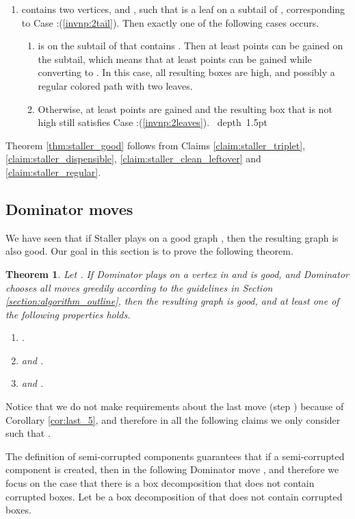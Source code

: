 \documentclass[11pt]{article}
\def\blackslug{\hbox{\hskip 1pt \vrule width 4pt height 8pt
    depth 1.5pt \hskip 1pt}}
\def\QED{\quad\blackslug\lower 8.5pt\null\par}
\def\dnsitem{\vspace{-7pt}\item}
\newtheorem{theorem}{Theorem}[section]
\theoremstyle{definition}
\begin{document}
\begin{enumerate}
		\dnsitem  contains two  vertices,  and , such that  is a leaf on a subtail of , corresponding to Case :(\ref{invnp:2tail}).
		Then exactly one of the following cases occurs.
		\begin{enumerate}
			\dnsitem  is on the subtail of  that contains . Then at least  points can be gained on the subtail, 
			which means that at least  points can be gained while converting  to .
			In this case, all resulting boxes are high, and possibly a regular colored path with two  leaves.
			\dnsitem Otherwise, at least  points are gained and the resulting box that is not high still satisfies Case :(\ref{invnp:2leaves}).
\QED
		\end{enumerate}
	\end{enumerate}

Theorem \ref{thm:staller_good} follows from Claims \ref{claim:staller_triplet}, \ref{claim:staller_dispensible}, \ref{claim:staller_clean_leftover} and \ref{claim:staller_regular}.

\subsection{Dominator moves}
\label{sub:an_dom}

We have seen that if Staller plays on a good graph , 
then the resulting graph is also good.
Our goal in this section is to prove the following theorem.

\begin{theorem}
\label{thm:dom_gain}
Let .
If Dominator plays on a vertex  in  and  is good, and Dominator chooses all moves greedily according to the guidelines in Section \ref{section:algorithm_outline},
then the resulting graph  is good, and at least one of the following properties holds.
\begin{enumerate}
	\dnsitem .
	\dnsitem  and .
	\dnsitem  and .
\end{enumerate}
\end{theorem}

Notice that we do not make requirements about the last move (step ) because of Corollary \ref{cor:last_5}, and therefore in all the following claims we only consider  such that .

The definition of semi-corrupted components guarantees that if a semi-corrupted component is created, then in the following Dominator move , and therefore we focus on the case that there is a box decomposition that does not contain corrupted boxes.
Let  be a box decomposition of  that does not contain corrupted boxes. 
\end{document}
